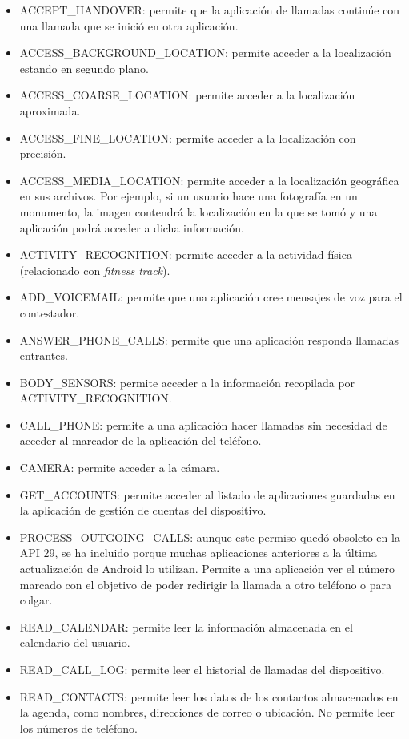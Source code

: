 \begin{itemize}
	\item ACCEPT\_HANDOVER: permite que la aplicación de llamadas continúe con una llamada que se inició en otra aplicación.
	\item ACCESS\_BACKGROUND\_LOCATION: permite acceder a la localización estando en segundo plano.
	\item ACCESS\_COARSE\_LOCATION: permite acceder a la localización aproximada.
	\item ACCESS\_FINE\_LOCATION: permite acceder a la localización con precisión.
	\item ACCESS\_MEDIA\_LOCATION: permite acceder a la localización geográfica en sus archivos. Por ejemplo, si un usuario hace una fotografía en un monumento, la imagen contendrá la localización en la que se tomó y una aplicación podrá acceder a dicha información.
	\item ACTIVITY\_RECOGNITION: permite acceder a la actividad física (relacionado con \textit{fitness track}).
	\item ADD\_VOICEMAIL: permite que una aplicación cree mensajes de voz para el contestador.
	\item ANSWER\_PHONE\_CALLS: permite que una aplicación responda llamadas entrantes.
	\item BODY\_SENSORS: permite acceder a la información recopilada por ACTIVITY\_RECOGNITION.
	\item CALL\_PHONE: permite a una aplicación hacer llamadas sin necesidad de acceder al marcador de la aplicación del teléfono.
	\item CAMERA: permite acceder a la cámara.
	\item GET\_ACCOUNTS: permite acceder al listado de aplicaciones guardadas en la aplicación de gestión de cuentas del dispositivo.
	\item PROCESS\_OUTGOING\_CALLS: aunque este permiso quedó obsoleto en la API 29, se ha incluido porque muchas aplicaciones anteriores a la última actualización de Android lo utilizan. Permite a una aplicación ver el número marcado con el objetivo de poder redirigir la llamada a otro teléfono o para colgar. 
	\item READ\_CALENDAR: permite leer la información almacenada en el calendario del usuario.
	\item READ\_CALL\_LOG: permite leer el historial de llamadas del dispositivo.
	\item READ\_CONTACTS: permite leer los datos de los contactos almacenados en la agenda, como nombres, direcciones de correo o ubicación. No permite leer los números de teléfono.

\end{itemize}
